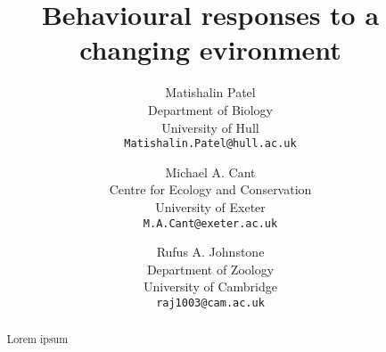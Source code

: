 \documentclass[12pt]{article}
\title{Behavioural responses to a changing evironment}
\author{
  Matishalin Patel\\
  Department of Biology \\
  University of Hull \\
  \texttt{Matishalin.Patel@hull.ac.uk} \\
  \and
  Michael A. Cant \\
  Centre for Ecology and Conservation\\
  University of Exeter \\
  \texttt{M.A.Cant@exeter.ac.uk} \\
  \and
  Rufus A. Johnstone\\
  Department of Zoology\\
  University of Cambridge \\
  \texttt{raj1003@cam.ac.uk} \\
}
\begin{document}
\maketitle

\begin{abstract}
  Lorem ipsum \cite{downingGroupFormationEvolutionary2020} \parencite{bowlesDidWarfareAncestral2009}
\end{abstract}
\doublespacing 







\printbibliography


\end{document}
